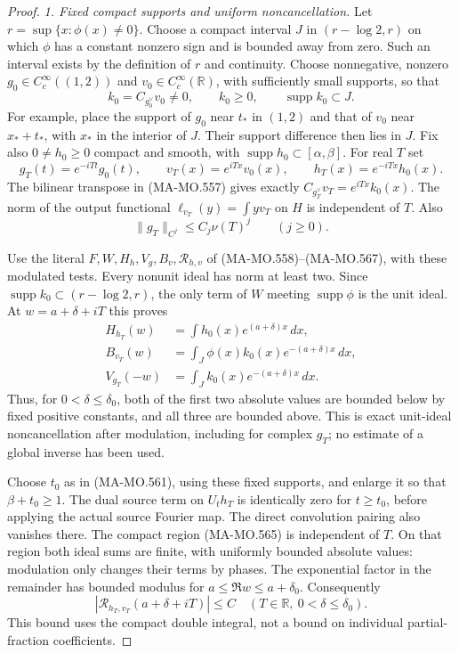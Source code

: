 \begin{proof}
\emph{1. Fixed compact supports and uniform noncancellation.}
Let $r=\sup\{x:\phi(x)\ne0\}$.  Choose a compact interval
$J$ in $(r-\log2,r)$ on which $\phi$ has a constant nonzero
sign and is bounded away from zero.  Such an interval exists
by the definition of $r$ and continuity.  Choose nonnegative,
nonzero $g_0\in C_c^\infty((1,2))$ and
$v_0\in C_c^\infty(\mathbb R)$, with sufficiently small
supports, so that
\[
 k_0=C_{g_0^\vee}v_0\ne0,\qquad
             k_0\ge0,\qquad \operatorname{supp}k_0\subset J.
 \tag{MA-MO.1204}
\]
For example, place the support of $g_0$ near $t_*$ in $(1,2)$
and that of $v_0$ near $x_*+t_*$, with $x_*$ in the interior
of $J$.  Their support difference then lies in $J$.
Fix also $0\ne h_0\ge0$ compact and smooth, with
$\operatorname{supp}h_0\subset[\alpha,\beta]$.
For real $T$ set
\[
 g_T(t)=e^{-iTt}g_0(t),\qquad
 v_T(x)=e^{iTx}v_0(x),\qquad
 h_T(x)=e^{-iTx}h_0(x).
 \tag{MA-MO.1205}
\]
The bilinear transpose in (MA-MO.557) gives exactly
$C_{g_T^\vee}v_T=e^{iTx}k_0(x)$.  The norm of the output
functional $\ell_{v_T}(y)=\int yv_T$ on $H$ is independent
of $T$.  Also
\[
 \|g_T\|_{C^j}\le C_j\nu(T)^j
                   \qquad(j\ge0).
 \tag{MA-MO.1206}
\]

Use the literal $F,W,H_h,V_g,B_v,\mathcal R_{h,v}$ of
(MA-MO.558)--(MA-MO.567), with these modulated tests.
Every nonunit ideal has norm at least two.  Since
$\operatorname{supp}k_0\subset(r-\log2,r)$, the only term
of $W$ meeting $\operatorname{supp}\phi$ is the unit ideal.
At $w=a+\delta+iT$ this proves
\[
 \begin{aligned}
 H_{h_T}(w)&=\int h_0(x)e^{(a+\delta)x}\,dx,\\
 B_{v_T}(w)&=\int_J\phi(x)k_0(x)e^{-(a+\delta)x}\,dx,\\
 V_{g_T}(-w)&=\int_Jk_0(x)e^{-(a+\delta)x}\,dx.
 \end{aligned}
 \tag{MA-MO.1207}
\]
Thus, for $0<\delta\le\delta_0$, both of the first two
absolute values are bounded below by fixed positive constants,
and all three are bounded above.  This is exact unit-ideal
noncancellation after modulation, including for complex $g_T$;
no estimate of a global inverse has been used.

Choose $t_0$ as in (MA-MO.561), using these fixed supports,
and enlarge it so that $\beta+t_0\ge1$.
The dual source term on $U_th_T$ is identically zero for
$t\ge t_0$, before applying the actual source Fourier map.
The direct convolution pairing also vanishes there.
The compact region (MA-MO.565) is independent of $T$.
On that region both ideal sums are finite, with uniformly
bounded absolute values: modulation only changes their terms
by phases.  The exponential factor in the remainder has
bounded modulus for $a\le\Re w\le a+\delta_0$.
Consequently
\[
       |\mathcal R_{h_T,v_T}(a+\delta+iT)|\le C
                    \quad(T\in\mathbb R,\ 0<\delta\le\delta_0).
 \tag{MA-MO.1208}
\]
This bound uses the compact double integral, not a bound on
individual partial-fraction coefficients.


\end{proof}
